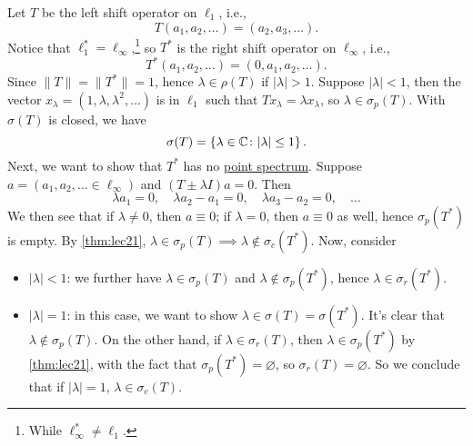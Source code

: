 \begin{eg}
	Let \(T\) be the left shift operator on \(\ell _1\), i.e.,
	\[
		T(a_1, a_2, \ldots  )= (a_2, a_3, \ldots  ).
	\]
	Notice that \(\ell _1^{\ast} = \ell _\infty \),\footnote{While \(\ell ^{\ast} _\infty \neq \ell _1\).} so \(T^{\ast} \) is the right shift operator on \(\ell _\infty \), i.e.,
	\[
		T^{\ast} (a_1, a_2, \ldots  ) = (0, a_1, a_2, \ldots  ).
	\]
	Since \(\lVert T \rVert = \lVert T^{\ast}  \rVert = 1\), hence \(\lambda \in \rho (T)\) if \(\vert \lambda  \vert > 1\). Suppose \(\vert \lambda  \vert < 1\), then the vector \(x_\lambda = (1, \lambda , \lambda ^{2} , \ldots  )\) is in \(\ell _1\) such that \(Tx_\lambda = \lambda x_\lambda \), so \(\lambda \in \sigma _p(T)\). With \(\sigma (T)\) is closed, we have
	\[
		\sigma (T) = \left\{ \lambda \in \mathbb{\MakeUppercase{c}} \colon \vert \lambda  \vert \leq 1 \right\} .
	\]
	Next, we want to show that \(T^{\ast} \) has no \hyperref[def:point-spectrum]{point spectrum}. Suppose \(a=(a_1, a_2, \ldots  \in \ell _\infty )\) and \((T\pm \lambda I)a=0\). Then
	\[
		\lambda a_1 = 0,\quad
		\lambda a_2 - a_1 = 0,\quad
		\lambda a_3 - a_2 = 0,\quad \ldots
	\]
	We then see that if \(\lambda \neq 0\), then \(a\equiv 0\); if \(\lambda = 0\), then \(a\equiv 0\) as well, hence \(\sigma _p(T^{\ast} )\) is empty. By \autoref{thm:lec21}, \(\lambda \in \sigma _p(T) \implies \lambda \notin \sigma _c(T^{\ast} )\). Now, consider
	\begin{itemize}
		\item \(\vert \lambda  \vert < 1\): we further have \(\lambda \in \sigma _p(T)\) and \(\lambda \notin \sigma _p(T^{\ast} )\), hence \(\lambda \in \sigma _r(T^{\ast} )\).
		\item \(\vert \lambda  \vert = 1\): in this case, we want to show \(\lambda \in \sigma (T) = \sigma (T^{\ast} )\). It's clear that \(\lambda \notin \sigma _p(T)\). On the other hand, if \(\lambda \in \sigma _r(T)\), then \(\lambda \in \sigma _p(T^{\ast} )\) by \autoref{thm:lec21}, with the fact that \(\sigma _p(T^{\ast} ) = \varnothing \), so \(\sigma _r(T) = \varnothing \). So we conclude that if \(\vert \lambda \vert = 1\), \(\lambda \in \sigma _c(T)\).


\end{itemize}
\end{eg}

